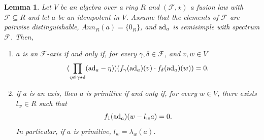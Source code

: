 \documentclass[a4paper]{amsart}
\newtheorem{lemma}{Lemma}[section]
\newcommand{\ad}{{\rm ad}}
\begin{document}
\begin{lemma}\label{condition}
Let $V$ be an algebra over a ring $R$ and $ (\mathcal F, \star)$ a fusion law with $\mathcal F\subseteq R$ and let $a$ be an idempotent in $V$.  Assume that the elements of $\mathcal F$ are pairwise distinguishable, $Ann_R(a)=\{0_R\}$, and $\ad_a$ is semisimple with spectrum $\mathcal F$. Then, 
\begin{enumerate}
\item $a$ is an $\mathcal F$-axis if and only if, for every  $\gamma, \delta\in \mathcal F$, and $v, w\in V$ 
\begin{equation}\label{cond2}
 (\prod_{\eta \in \gamma\star \delta}(\ad_a-\eta )) (f_\gamma(\ad_a)( v) \cdot f_\delta(\ad_a) (w))=0.
\end{equation}
\item if $a$ is an axis, then $a$ is primitive if and only if, for every  $w\in V$, there exists $l_w\in R$ such that
 \begin{equation}\label{cond1}
 f_1(\ad_a)(w-l_w a) =0.
 \end{equation}
In particular, if  $a$ is primitive, $l_w=\lambda_w(a)$.
\end{enumerate}
\end{lemma}
\end{document}
